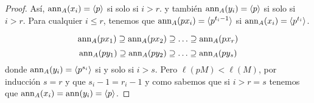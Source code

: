\begin{proof}
  Así, \(\operatorname{ann}_A(x_i)=\langle p\rangle\) si solo si \(i>r\).
  y también \(\operatorname{ann}_A(y_i)=\langle p\rangle\) si solo si \(i>r\).
  Para cualquier \(i\le r\), tenemos que \(\operatorname{ann}_A(px_i)=\langle
  p^{t_i-1}\rangle\) si \(\operatorname{ann}_A(x_i)=\langle p^{t_i}\rangle\).

  \[
   \operatorname{ann}_A(px_1)\supseteq\operatorname{ann}_A(px_2)\supseteq\ldots
    \supseteq\operatorname{ann}_A(px_r)
  \]
  \[
   \operatorname{ann}_A(py_1)\supseteq\operatorname{ann}_A(py_2)\supseteq\ldots
    \supseteq\operatorname{ann}_A(py_s)
  \]
  donde \(\operatorname{ann}_A(y_i)=\langle p^{s_i}\rangle\) si y solo si \(i>s\).
  Pero \(\ell(pM)<\ell(M)\), por inducción \(s=r\) y que \(s_i-1=
  r_i-1\) y como sabemos que si \(i>r=s\) tenemos que
  \(\operatorname{ann}_A(x_i)=\operatorname{ann}(y_i)=\langle p\rangle\).

\end{proof}
